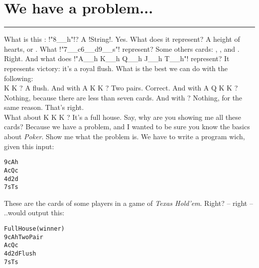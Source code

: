 \newpage
\section{We have a problem...} %
\vspace{10cm}
\hrule

\lhQ What is this : \il!"8__h"!?
\lhA A \il!String!.
\lhN Yes. What does it represent?
\lhA A height of hearts, or .
\lhN What \il!"7__c6__d9__s"! represent?
\lhA Some others cards: , , and .
\lhN Right. And what does \il!"A__h K__h Q__h J__h T__h"! represent?
\lhA It represents victory: it's a royal flush.
\lhN What is the best we can do with the following: \\
   \spades K \diamonds K   ?
\lhA A flush.
\lhN And with  \hearts A \spades K \diamonds K   ?
\lhA Two pairs.
\lhN Correct. And with \clubs A \clubs Q \spades K \diamonds K  ?
\lhA Nothing, because there are less than seven cards.
\lhN And with  ?
\lhA Nothing, for the same reason.
\lhN That's right. \\
What about \clubs K  \spades K \diamonds K    ?
\lhA It's a full house. Say, why are you showing me all these cards?
\lhN Because we have a problem, and I wanted to be sure you know the basics about \emph{Poker}.
\lhA Show me what the problem is.
\lhN We have to write a program wich, given this input:
\begin{alltt}
      
9c Ah     
Ac Qc    
 
4d 2d     
7s Ts   
\end{alltt}
\hspace*{\fill} 
\lhA These are the cards of some players in a game of \emph{Texas Hold'em}. Right?
\lhN -- right -- ..would output this:
\begin{alltt}
       Full House (winner)
9c Ah      Two Pair
Ac Qc     
  
4d 2d      Flush
7s Ts    
\end{alltt}
